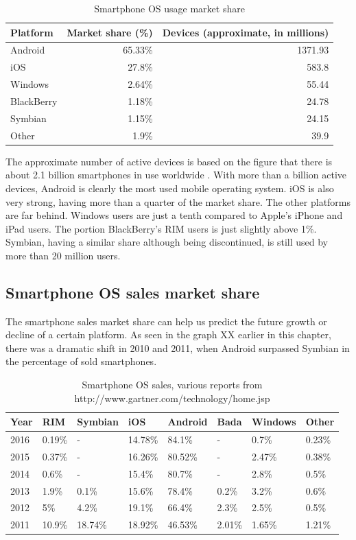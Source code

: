 \documentclass[english,master,public,dept460,male,cpdeclaration,oneside]{diploma}
\begin{document}
\begin{table}[hb]
	\centering
	\caption{Smartphone OS usage market share}
	\begin{tabular}{l r r}
		\toprule		
		Platform & Market share (\%) & Devices (approximate, in millions) \\
		\midrule
		Android & 65.33\% & 1371.93 \\
		iOS & 27.8\% & 583.8 \\
		Windows & 2.64\% & 55.44 \\
		BlackBerry & 1.18\% & 24.78 \\
		Symbian & 1.15\% & 24.15\\
		Other & 1.9\% & 39.9\\
		\midrule
	\end{tabular}
\end{table}

The approximate number of active devices is based on the figure that there is about 2.1 billion smartphones in use worldwide \cite{noOfSmartphones}. With more than a billion active devices, Android is clearly the most used mobile operating system. iOS is also very strong, having more than a quarter of the market share. The other platforms are far behind. Windows users are just a tenth compared to Apple’s iPhone and iPad users. The portion BlackBerry’s RIM users is just slightly above 1\%. Symbian, having a similar share although being discontinued, is still used by more than 20 million users.

\subsection{Smartphone OS sales market share}
The smartphone sales market share can help us predict the future growth or decline of a certain platform. As seen in the graph XX earlier in this chapter, there was a dramatic shift in 2010 and 2011, when Android surpassed Symbian in the percentage of sold smartphones.

\begin{table}
	\centering
	\caption{Smartphone OS sales, various reports from http://www.gartner.com/technology/home.jsp}
	\begin{tabular}{l l l l l l l l}
		\toprule
		Year & RIM & Symbian & iOS & Android & Bada & Windows & Other\\
		\midrule		
		2016 & 0.19\% & - & 14.78\% & 84.1\% & - & 0.7\% & 0.23\% \\
		2015 & 0.37\% & - & 16.26\% & 80.52\% & - & 2.47\% & 0.38\% \\
		2014 & 0.6\% & - & 15.4\% & 80.7\% & - & 2.8\% & 0.5\% \\
		2013 & 1.9\% & 0.1\% & 15.6\% & 78.4\% & 0.2\% & 3.2\% & 0.6\% \\
		2012 & 5\% & 4.2\% & 19.1\% & 66.4\% & 2.3\% & 2.5\% & 0.5\% \\
		2011 & 10.9\% & 18.74\% & 18.92\% & 46.53\% & 2.01\% & 1.65\% & 1.21\% \\
		\midrule		
	\end{tabular}
\end{table}
\end{document}
